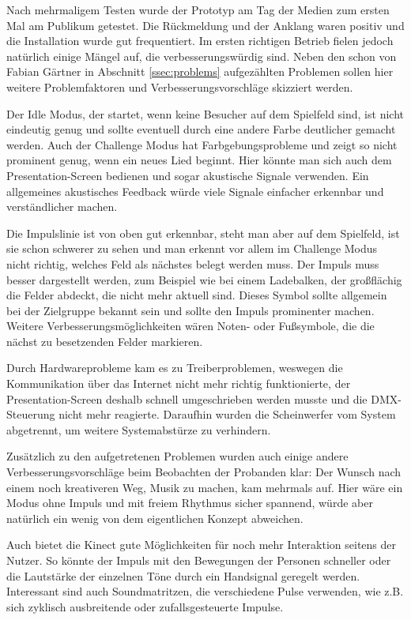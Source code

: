 \label{ssec:Praxis}

Nach mehrmaligem Testen wurde der Prototyp am Tag der Medien zum ersten Mal am Publikum getestet. Die Rückmeldung und der Anklang waren positiv und die Installation wurde gut frequentiert. Im ersten richtigen Betrieb fielen jedoch natürlich einige Mängel auf, die verbesserungswürdig sind. Neben den schon von Fabian Gärtner in Abschnitt \ref{ssec:problems} aufgezählten Problemen sollen hier weitere Problemfaktoren und Verbesserungsvorschläge skizziert werden.

Der Idle Modus, der startet, wenn keine Besucher auf dem Spielfeld sind, ist nicht eindeutig genug und sollte eventuell durch eine andere Farbe deutlicher gemacht werden. Auch der Challenge Modus hat Farbgebungsprobleme und zeigt so nicht prominent genug, wenn ein neues Lied beginnt. Hier könnte man sich auch dem Presentation-Screen bedienen und sogar akustische Signale verwenden. Ein allgemeines akustisches Feedback würde viele Signale einfacher erkennbar und verständlicher machen.

Die Impulslinie ist von oben gut erkennbar, steht man aber auf dem Spielfeld, ist sie schon schwerer zu sehen und man erkennt vor allem im Challenge Modus nicht richtig, welches Feld als nächstes belegt werden muss. Der Impuls muss besser dargestellt werden, zum Beispiel wie bei einem Ladebalken, der großflächig die Felder abdeckt, die nicht mehr aktuell sind. Dieses Symbol sollte allgemein bei der Zielgruppe bekannt sein und sollte den Impuls prominenter machen. Weitere Verbesserungsmöglichkeiten wären Noten- oder Fußsymbole, die die nächst zu besetzenden Felder markieren.

Durch Hardwareprobleme kam es zu Treiberproblemen, weswegen die Kommunikation über das Internet nicht mehr richtig funktionierte, der Presentation-Screen deshalb schnell umgeschrieben werden musste und die DMX-Steuerung nicht mehr reagierte. Daraufhin wurden die Scheinwerfer vom System abgetrennt, um weitere Systemabstürze zu verhindern.

Zusätzlich zu den aufgetretenen Problemen wurden auch einige andere Verbesserungsvorschläge beim Beobachten der Probanden klar: Der Wunsch nach einem noch kreativeren Weg, Musik zu machen, kam mehrmals auf. Hier wäre ein Modus ohne Impuls und mit freiem Rhythmus sicher spannend, würde aber natürlich ein wenig von dem eigentlichen Konzept abweichen.

Auch bietet die Kinect gute Möglichkeiten für noch mehr Interaktion seitens der Nutzer. So könnte der Impuls mit den Bewegungen der Personen schneller oder die Lautstärke der einzelnen Töne durch ein Handsignal geregelt werden. Interessant sind auch Soundmatritzen, die verschiedene Pulse verwenden, wie z.B. sich zyklisch ausbreitende oder zufallsgesteuerte Impulse.

